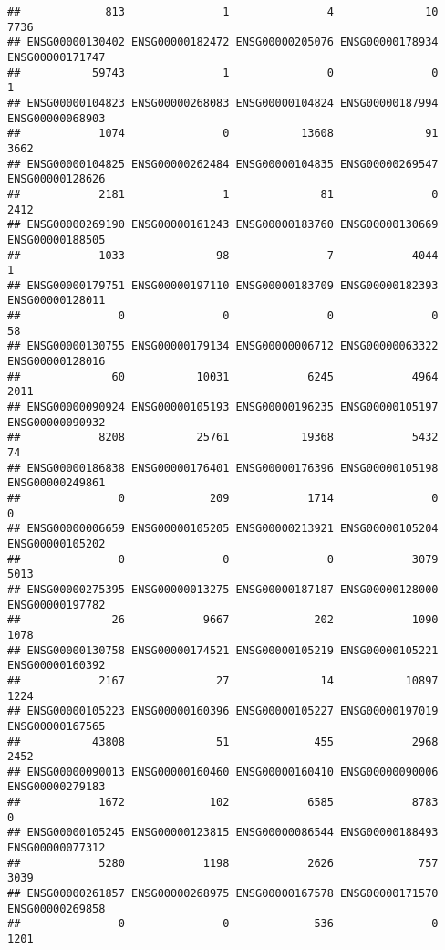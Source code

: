 \documentclass[
]{article}
\begin{document}
\begin{verbatim}
##             813               1               4              10            7736 
## ENSG00000130402 ENSG00000182472 ENSG00000205076 ENSG00000178934 ENSG00000171747 
##           59743               1               0               0               1 
## ENSG00000104823 ENSG00000268083 ENSG00000104824 ENSG00000187994 ENSG00000068903 
##            1074               0           13608              91            3662 
## ENSG00000104825 ENSG00000262484 ENSG00000104835 ENSG00000269547 ENSG00000128626 
##            2181               1              81               0            2412 
## ENSG00000269190 ENSG00000161243 ENSG00000183760 ENSG00000130669 ENSG00000188505 
##            1033              98               7            4044               1 
## ENSG00000179751 ENSG00000197110 ENSG00000183709 ENSG00000182393 ENSG00000128011 
##               0               0               0               0              58 
## ENSG00000130755 ENSG00000179134 ENSG00000006712 ENSG00000063322 ENSG00000128016 
##              60           10031            6245            4964            2011 
## ENSG00000090924 ENSG00000105193 ENSG00000196235 ENSG00000105197 ENSG00000090932 
##            8208           25761           19368            5432              74 
## ENSG00000186838 ENSG00000176401 ENSG00000176396 ENSG00000105198 ENSG00000249861 
##               0             209            1714               0               0 
## ENSG00000006659 ENSG00000105205 ENSG00000213921 ENSG00000105204 ENSG00000105202 
##               0               0               0            3079            5013 
## ENSG00000275395 ENSG00000013275 ENSG00000187187 ENSG00000128000 ENSG00000197782 
##              26            9667             202            1090            1078 
## ENSG00000130758 ENSG00000174521 ENSG00000105219 ENSG00000105221 ENSG00000160392 
##            2167              27              14           10897            1224 
## ENSG00000105223 ENSG00000160396 ENSG00000105227 ENSG00000197019 ENSG00000167565 
##           43808              51             455            2968            2452 
## ENSG00000090013 ENSG00000160460 ENSG00000160410 ENSG00000090006 ENSG00000279183 
##            1672             102            6585            8783               0 
## ENSG00000105245 ENSG00000123815 ENSG00000086544 ENSG00000188493 ENSG00000077312 
##            5280            1198            2626             757            3039 
## ENSG00000261857 ENSG00000268975 ENSG00000167578 ENSG00000171570 ENSG00000269858 
##               0               0             536               0            1201 

\end{verbatim}
\end{document}

